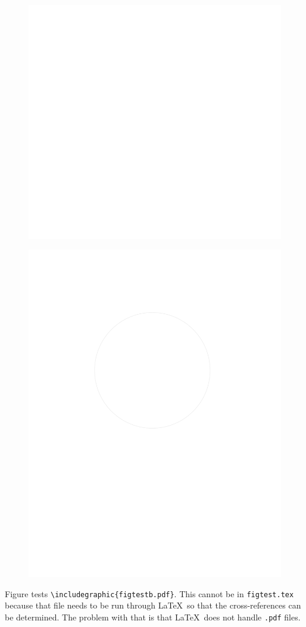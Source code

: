 \documentclass{article}
\begin{document}
\begin{figure}
\includegraphics{figtestb.pdf}
\end{figure}

\begin{figure}
\includegraphics{figtestc.pdf}
\end{figure}

Figure tests \verb#\includegraphic{figtestb.pdf}#.  This cannot be in
\texttt{figtest.tex} because that file needs to be run through \LaTeX\
so that the cross-references can be determined.  The problem with
that is that \LaTeX\ does not handle \texttt{.pdf} files.  
\end{document}
